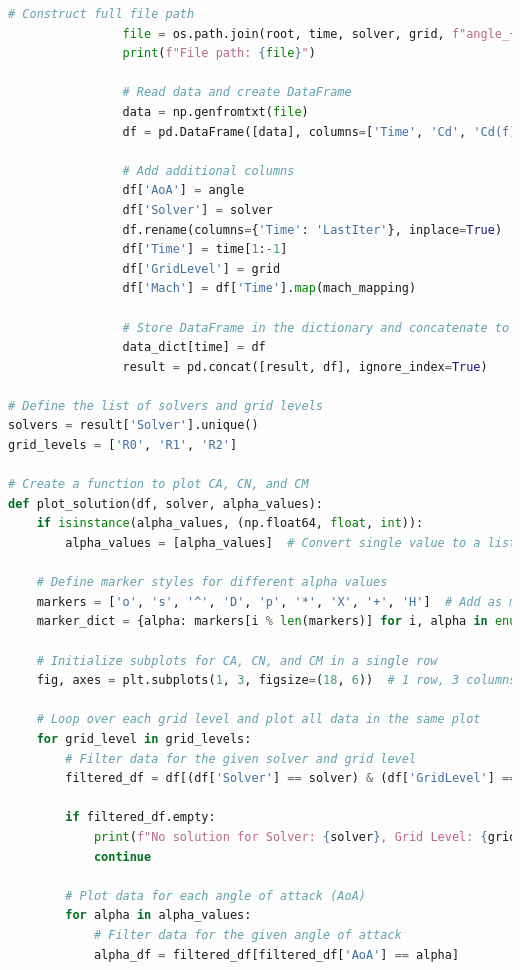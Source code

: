 \documentclass[12pt]{article}
\begin{document}
\begin{lstlisting}[language=Python, caption=Python script used to post-process numerical solutions. To report bugs email to: lorenzo.campoli@gspace.com, label=lst:pp]
                # Construct full file path
                file = os.path.join(root, time, solver, grid, f"angle_{angle}", file_path, latest_time, file_name)
                print(f"File path: {file}")
                
                # Read data and create DataFrame
                data = np.genfromtxt(file)
                df = pd.DataFrame([data], columns=['Time', 'Cd', 'Cd(f)', 'Cd(r)', 'Cl', 'Cl(f)', 'Cl(r)', 'CmPitch', 'CmRoll', 'CmYaw', 'Cs', 'Cs(f)', 'Cs(r)'])
                
                # Add additional columns
                df['AoA'] = angle
                df['Solver'] = solver
                df.rename(columns={'Time': 'LastIter'}, inplace=True)
                df['Time'] = time[1:-1]
                df['GridLevel'] = grid
                df['Mach'] = df['Time'].map(mach_mapping)
                
                # Store DataFrame in the dictionary and concatenate to the result
                data_dict[time] = df
                result = pd.concat([result, df], ignore_index=True)

# Define the list of solvers and grid levels
solvers = result['Solver'].unique()
grid_levels = ['R0', 'R1', 'R2']

# Create a function to plot CA, CN, and CM
def plot_solution(df, solver, alpha_values):
    if isinstance(alpha_values, (np.float64, float, int)):
        alpha_values = [alpha_values]  # Convert single value to a list
    
    # Define marker styles for different alpha values
    markers = ['o', 's', '^', 'D', 'p', '*', 'X', '+', 'H']  # Add as many markers as needed
    marker_dict = {alpha: markers[i % len(markers)] for i, alpha in enumerate(alpha_values)}
    
    # Initialize subplots for CA, CN, and CM in a single row
    fig, axes = plt.subplots(1, 3, figsize=(18, 6))  # 1 row, 3 columns
    
    # Loop over each grid level and plot all data in the same plot
    for grid_level in grid_levels:
        # Filter data for the given solver and grid level
        filtered_df = df[(df['Solver'] == solver) & (df['GridLevel'] == grid_level)]
        
        if filtered_df.empty:
            print(f"No solution for Solver: {solver}, Grid Level: {grid_level}")
            continue
        
        # Plot data for each angle of attack (AoA)
        for alpha in alpha_values:
            # Filter data for the given angle of attack
            alpha_df = filtered_df[filtered_df['AoA'] == alpha]
            

\end{lstlisting}
\end{document}
